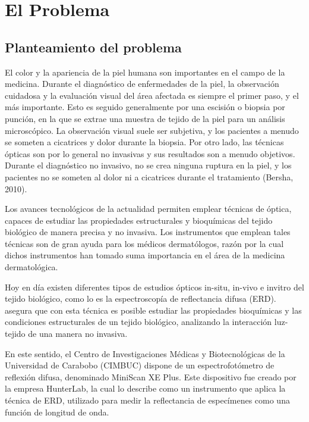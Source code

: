 \chapter{El Problema}

	\section{Planteamiento del problema}	
El color y la apariencia de la piel humana son importantes en el campo de la medicina. Durante el diagn\'{o}stico de enfermedades de la piel, la observaci\'{o}n cuidadosa y la evaluaci\'{o}n visual del \'{a}rea afectada es siempre el primer paso, y el m\'{a}s importante. Esto es seguido generalmente por una escisi\'{o}n o biopsia por punci\'{o}n, en la que se extrae una muestra de tejido de la piel para un an\'{a}lisis microsc\'{o}pico. La observaci\'{o}n visual suele ser subjetiva, y los pacientes a menudo se someten a cicatrices y dolor durante la biopsia. Por otro lado, las t\'{e}cnicas \'{o}pticas son por lo general no invasivas y sus resultados son a menudo objetivos. Durante el diagn\'{o}stico no invasivo, no se crea ninguna ruptura en la piel, y los pacientes no se someten al dolor ni a cicatrices durante el tratamiento (Bersha, 2010).

Los avances tecnol\'{o}gicos de la actualidad permiten emplear t\'{e}cnicas de \'{o}ptica, capaces de estudiar  las propiedades estructurales y bioqu\'{i}micas del tejido biol\'{o}gico de manera precisa y no invasiva. Los instrumentos que emplean tales t\'{e}cnicas son de gran ayuda para los m\'{e}dicos dermat\'{o}logos, raz\'{o}n por la cual dichos instrumentos han tomado suma importancia en el \'{a}rea de la medicina dermatol\'{o}gica.

Hoy en d\'{i}a existen diferentes tipos de estudios \'{o}pticos in-situ, in-vivo e invitro del tejido biol\'{o}gico, como lo es la espectroscop\'{i}a de reflectancia difusa (ERD). \cite{Perez} asegura que con esta t\'{e}cnica es  posible estudiar las propiedades bioqu\'{i}micas y las condiciones estructurales de un tejido biol\'{o}gico, analizando la interacci\'{o}n luz-tejido de una manera no invasiva.

En este sentido, el Centro de Investigaciones M\'{e}dicas y Biotecnol\'{o}gicas de la Universidad de Carabobo (CIMBUC) dispone de un espectrofot\'{o}metro de reflexi\'{o}n difusa, denominado MiniScan XE Plus. Este dispositivo fue creado por la empresa HunterLab, la cual lo describe como un instrumento que aplica la t\'{e}cnica de ERD, utilizado para medir la reflectancia de espec\'{i}menes como una funci\'{o}n de longitud de onda.

